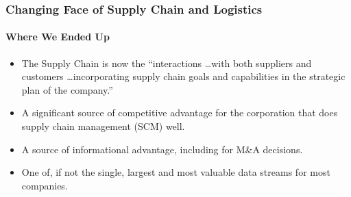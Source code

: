 \begin{frame}
  \frametitle{Changing Face of Supply Chain and Logistics}
  \framesubtitle{Where We Ended Up}
  \begin{itemize}
    \item<1-> The Supply Chain is now the ``interactions \ldots with both suppliers and customers \ldots incorporating supply chain goals and capabilities in the strategic plan of the company.''
    \item <2->  A significant source of competitive advantage for the corporation that does supply chain management (SCM) well.

    \item <3-> A source of informational advantage, including for M\&A decisions.
    \item <4-> One of, if not the single, largest and most valuable data streams for most companies.



  \end{itemize}
\end{frame}
